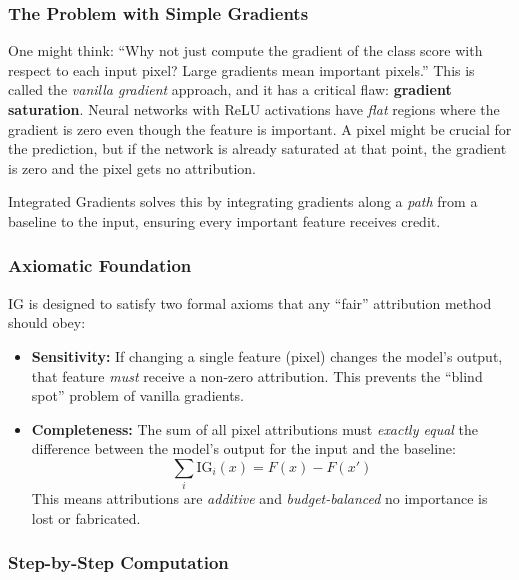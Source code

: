 \documentclass[12pt, a4paper]{article}
\begin{document}
\subsubsection{The Problem with Simple Gradients}

One might think: ``Why not just compute the gradient of the class score with
respect to each input pixel?  Large gradients mean important pixels.''  This
is called the \emph{vanilla gradient} approach, and it has a critical flaw:
\textbf{gradient saturation}.  Neural networks with ReLU activations have
\emph{flat} regions where the gradient is zero even though the feature is
important.  A pixel might be crucial for the prediction, but if the network is
already saturated at that point, the gradient is zero and the pixel gets no
attribution.

Integrated Gradients solves this by integrating gradients along a \emph{path}
from a baseline to the input, ensuring every important feature receives credit.

\subsubsection{Axiomatic Foundation}

IG is designed to satisfy two formal axioms that any ``fair'' attribution method
should obey:

\begin{itemize}[leftmargin=*]
    \item \textbf{Sensitivity:} If changing a single feature (pixel) changes
          the model's output, that feature \emph{must} receive a non-zero
          attribution.  This prevents the ``blind spot'' problem of vanilla
          gradients.
    \item \textbf{Completeness:} The sum of all pixel attributions must
          \emph{exactly equal} the difference between the model's output for
          the input and the baseline:
          \begin{equation}
          \sum_i \text{IG}_i(x) = F(x) - F(x')
          \end{equation}
          This means attributions are \emph{additive} and
          \emph{budget-balanced} no importance is lost or fabricated.
\end{itemize}

\subsubsection{Step-by-Step Computation}
\end{document}

